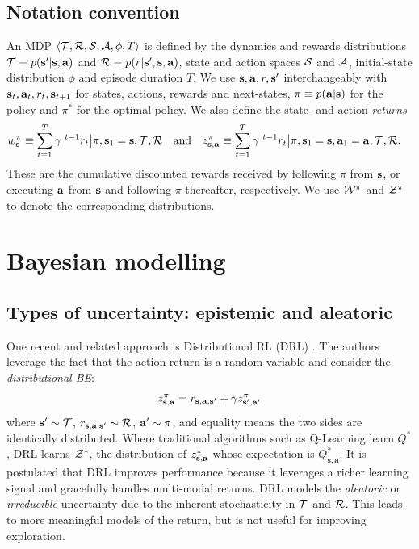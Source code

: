 \documentclass{article}
\begin{document}
\subsection{Notation convention}

An MDP $\langle \mathcal{T}, \mathcal{R}, \mathcal{S}, \mathcal{A}, \phi, T \rangle$ is defined by the dynamics and rewards distributions $\mathcal{T} \equiv p(\mathbf{s}' | \mathbf{s}, \mathbf{a})$ and $\mathcal{R} \equiv p(r | \mathbf{s}', \mathbf{s}, \mathbf{a})$, state and action spaces $\mathcal{S}$ and $\mathcal{A}$, initial-state distribution $\phi$ and episode duration $T$. We use $\mathbf{s}, \mathbf{a}, r, \mathbf{s}'$ interchangeably with $\mathbf{s}_t, \mathbf{a}_t, r_t, \mathbf{s}_{t+1}$ for states, actions, rewards and next-states, $\pi \equiv p(\mathbf{a} | \mathbf{s})$ for the policy and $\pi^*$ for the optimal policy. We also define the state- and action-\textit{returns}
\begin{align}
w^\pi_{\mathbf{s}} \equiv \sum_{t = 1}^T \gamma^{~t - 1} r_t \big| \pi, \mathbf{s}_1 = \mathbf{s}, \mathcal{T}, \mathcal{R} ~~\text{ and }~~z^\pi_{\mathbf{s}, \mathbf{a}} &\equiv \sum_{t = 1}^T \gamma^{~t - 1} r_t \big| \pi, \mathbf{s}_1 = \mathbf{s}, \mathbf{a}_1 = \mathbf{a}, \mathcal{T}, \mathcal{R}.
\end{align}
These are the cumulative discounted rewards received by following $\pi$ from $\mathbf{s}$, or executing $\mathbf{a}$ from $\mathbf{s}$ and following $\pi$ thereafter, respectively. We use $\mathcal{W}^\pi$ and $\mathcal{Z}^\pi$ to denote the corresponding distributions.

\section{Bayesian modelling}

\subsection{Types of uncertainty: epistemic and aleatoric}

One recent and related approach is Distributional RL (DRL) \citep{distperrl}. The authors leverage the fact that the action-return is a random variable and consider the \textit{distributional BE}:
\begin{align} \label{eq:distributional}
z^\pi_{\mathbf{s}, \mathbf{a}} = r_{\mathbf{s}, \mathbf{a}, \mathbf{s}'} + \gamma z^\pi_{\mathbf{s}', \mathbf{a}'}
\end{align}
where $\mathbf{s}' \sim \mathcal{T}$, $r_{\mathbf{s}, \mathbf{a}, \mathbf{s}'} \sim \mathcal{R}$, $\mathbf{a}' \sim \pi$, and equality means the two sides are identically distributed. Where traditional algorithms such as Q-Learning \citep{qlearning} learn $Q^*$, DRL learns $\mathcal{Z}^*$, the distribution of $z^*_{\mathbf{s}, \mathbf{a}}$ whose expectation is $Q^*_{\mathbf{s}, \mathbf{a}}$. It is postulated that DRL improves performance because it leverages a richer learning signal and gracefully handles multi-modal returns. DRL models the \textit{aleatoric} or \textit{irreducible} uncertainty due to the inherent stochasticity in $\mathcal{T}$ and $\mathcal{R}$. This leads to more meaningful models of the return, but is not useful for improving exploration.
\end{document}
